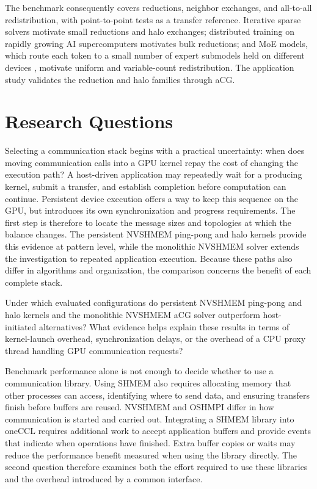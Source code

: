 The benchmark consequently covers reductions, neighbor exchanges, and all-to-all redistribution, with point-to-point tests as a transfer reference. Iterative sparse solvers motivate small reductions and halo exchanges; distributed training on rapidly growing AI supercomputers \cite{pilz_trends_2025} motivates bulk reductions; and \ac{MoE} models, which route each token to a small number of expert submodels held on different devices \cite{mu_comprehensive_2026}, motivate uniform and variable-count redistribution. The application study validates the reduction and halo families through aCG.

\section{Research Questions}

Selecting a communication stack begins with a practical uncertainty: when does moving communication calls into a GPU kernel repay the cost of changing the execution path? A host-driven application may repeatedly wait for a producing kernel, submit a transfer, and establish completion before computation can continue. Persistent device execution offers a way to keep this sequence on the GPU, but introduces its own synchronization and progress requirements. The first step is therefore to locate the message sizes and topologies at which the balance changes. The persistent NVSHMEM ping-pong and halo kernels provide this evidence at pattern level, while the monolithic NVSHMEM solver extends the investigation to repeated application execution. Because these paths also differ in algorithms and organization, the comparison concerns the benefit of each complete stack.

\begin{researchquestion}
Under which evaluated configurations do persistent NVSHMEM ping-pong and halo kernels and the monolithic NVSHMEM aCG solver outperform host-initiated alternatives? What evidence helps explain these results in terms of kernel-launch overhead, synchronization delays, or the overhead of a CPU proxy thread handling GPU communication requests?
\end{researchquestion}

Benchmark performance alone is not enough to decide whether to use a communication library. Using SHMEM also requires allocating memory that other processes can access, identifying where to send data, and ensuring transfers finish before buffers are reused. NVSHMEM and OSHMPI differ in how communication is started and carried out. Integrating a SHMEM library into oneCCL requires additional work to accept application buffers and provide events that indicate when operations have finished. Extra buffer copies or waits may reduce the performance benefit measured when using the library directly. The second question therefore examines both the effort required to use these libraries and the overhead introduced by a common interface.


